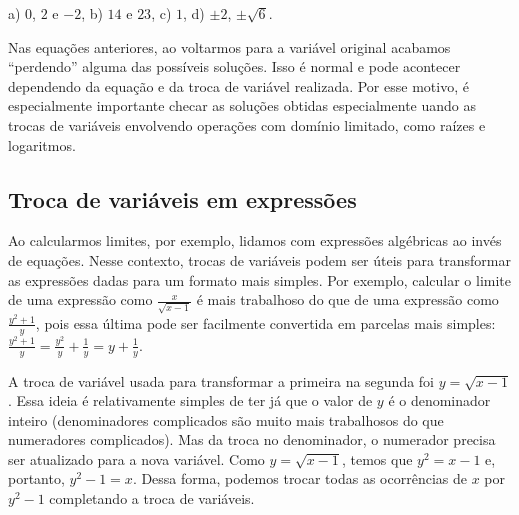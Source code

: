 \documentclass[main.tex]{subfiles}
\begin{document}

\begin{gabarito}
	\begin{gabaritoQuestao}
		a) $0$, $2$ e $-2$, b) $14$ e $23$, c) $1$, d) $\pm2$, $\pm\sqrt{6}$.
	\end{gabaritoQuestao}
\end{gabarito}

Nas equações anteriores, ao voltarmos para a variável original acabamos ``perdendo'' alguma das possíveis soluções. Isso é normal e pode acontecer dependendo da equação e da troca de variável realizada. Por esse motivo, é especialmente importante checar as soluções obtidas especialmente uando as trocas de variáveis envolvendo operações com domínio limitado, como raízes e logaritmos.

\subsection*{Troca de variáveis em expressões}

Ao calcularmos limites, por exemplo, lidamos com expressões algébricas ao invés de equações. Nesse contexto, trocas de variáveis podem ser úteis para transformar as expressões dadas para um formato mais simples. Por exemplo, calcular o limite de uma expressão como $\frac{x}{\sqrt{x-1}}$ é mais trabalhoso do que de uma expressão como $\frac{y^2+1}{y}$, pois essa última pode ser facilmente convertida em parcelas mais simples: $\frac{y^2+1}{y}=\frac{y^2}{y}+\frac{1}{y}=y+\frac{1}{y}$.

A troca de variável usada para transformar a primeira na segunda foi $y=\sqrt{x-1}$. Essa ideia é relativamente simples de ter já que o valor de $y$ é o denominador inteiro (denominadores complicados são muito mais trabalhosos do que numeradores complicados). Mas da troca no denominador, o numerador precisa ser atualizado para a nova variável. Como $y=\sqrt{x-1}$, temos que $y^2=x-1$ e, portanto, $y^2-1=x$. Dessa forma, podemos trocar todas as ocorrências de $x$ por $y^2-1$ completando a troca de variáveis.
\end{document}
